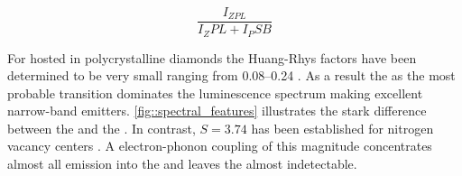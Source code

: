    \begin{equation}
     \frac{I_{ZPL}}{I_ZPL + I_PSB}
   \end{equation}

   For \sivs hosted in polycrystalline diamonds the Huang-Rhys factors have been determined to be very small ranging from \SIrange{0.08}{0.24}{} \cite{Duligall2006,Yuan2002,Nothaft2012}. As a result the \zpl as the most probable transition dominates the luminescence spectrum making \sivs excellent narrow-band emitters. \cref{fig::spectral_features} illustrates the stark difference between the \zpl and the \psb. In contrast, $S=3.74$ has been established for nitrogen vacancy centers \cite{Davies1981}. A electron-phonon coupling of this magnitude concentrates almost all emission into the \psb and leaves the \zpl almost indetectable.

